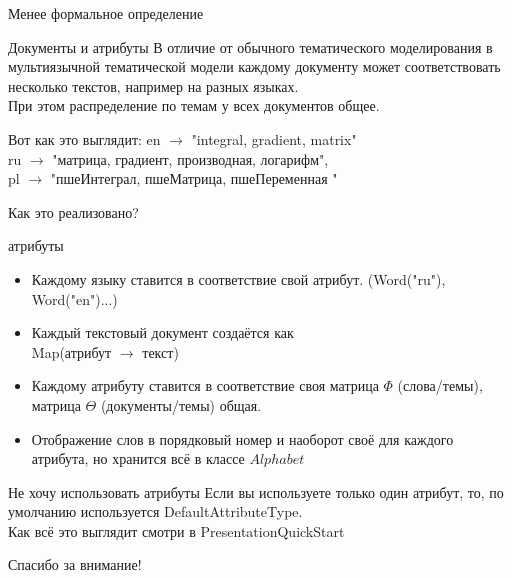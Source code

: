 \documentclass{beamer}
\begin{document}
\begin{frame}{Менее формальное определение}
    \begin{block}{Документы и атрибуты}
	В отличие от обычного тематического моделирования в мультиязычной тематической модели каждому документу может соответствовать несколько текстов, например на разных языках.\\
	При этом распределение по темам у всех документов общее. 
	
    \end{block}

    \begin{block}{Вот как это выглядит:}
	en $\to$ "integral, gradient, matrix" \\ ru $\to$ "матрица, градиент, производная, логарифм", \\ pl $\to$ "пшеИнтеграл, пшеМатрица, пшеПеременная "
    \end{block}
\end{frame}

\begin{frame}{Как это реализовано?}
    \begin{block}{атрибуты}
	\begin{itemize}
	    \item Каждому языку ставится в соответствие свой атрибут. (Word("ru"), Word("en")...)
	    \item Каждый текстовый документ создаётся как\\ Map(атрибут $\to$ текст)
	    \item Каждому атрибуту ставится в соответствие своя матрица $\Phi$ (слова/темы), матрица $\Theta$ (документы/темы) общая. 
	    \item Отображение слов в порядковый номер и наоборот своё для каждого атрибута, но хранится всё в классе $Alphabet$
	\end{itemize}
    \end{block}

    \begin{block}{Не хочу использовать атрибуты}
	Если вы используете только один атрибут, то, по умолчанию используется DefaultAttributeType. \\
	Как всё это выглядит смотри в PresentationQuickStart
    \end{block}
\end{frame}

\begin{frame}
    \begin{center}
	\Huge Спасибо за внимание!
    \end{center}
\end{frame}
\end{document}

